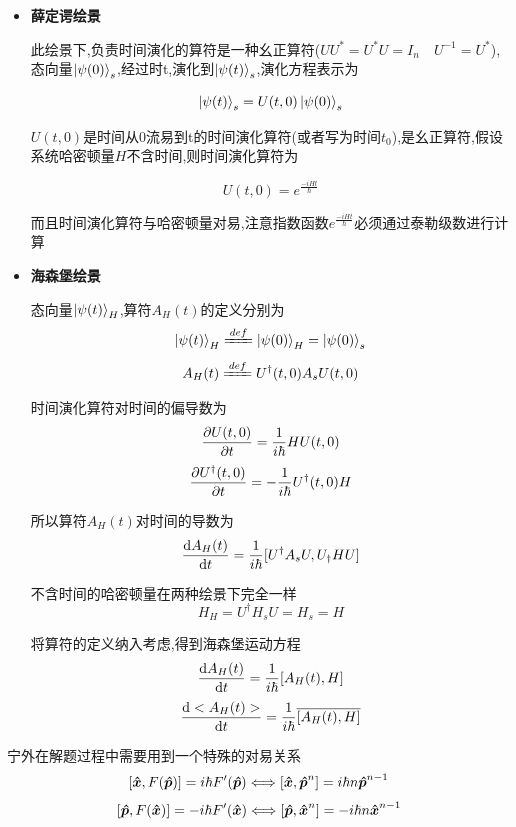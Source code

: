             \begin{formal}

                \begin{itemize}
                    \item 
                    \textbf{薛定谔绘景} 

                    此绘景下,负责时间演化的算符是一种幺正算符($ UU^{*} = U^{*}U = I_{n} \quad U^{-1} = U^{*} $),态向量$\ket{\psi(0)}_{s}$,经过时t,演化到$\ket{\psi(t)}_{s}$,演化方程表示为
    
                    $$ \ket{\psi(t)}_{s} = U(t,0) \ket{\psi(0)}_{s} $$
    
                    $U(t,0)$是时间从0流易到t的时间演化算符(或者写为时间$t_{0}$),是幺正算符,假设系统哈密顿量$H$不含时间,则时间演化算符为
    
                    $$ U(t,0) = e^{\frac{-iHt}{\hbar}} $$
    
                    而且时间演化算符与哈密顿量对易,注意指数函数$e^{\frac{-iHt}{\hbar}}$必须通过泰勒级数进行计算

                    \item   
                    \textbf{海森堡绘景} 

                    态向量$\ket{\psi(t)}_{H}$,算符$A_{H}(t)$的定义分别为
                    $$ \ket{\psi(t)}_{H} \xlongequal{def} \ket{\psi(0)}_{H} = \ket{\psi(0)}_{s}$$
                    $$ A_{H}(t) \xlongequal{def} U^{\dagger}(t,0)A_{s}U(t,0) $$

                    时间演化算符对时间的偏导数为
                    $$ \pdv{U(t,0)}{t} = \frac{1}{i\hbar} H U(t,0) $$
                    $$ \pdv{U^{\dagger}(t,0)}{t} = - \frac{1}{i\hbar} U^{\dagger}(t,0) H$$

                    所以算符$A_{H}(t)$对时间的导数为
                    $$ \dv{A_{H}(t)}{t} = \frac{1}{i \hbar} [U^{\dagger} A_{s} U,U_{\dagger} H U]$$

                    不含时间的哈密顿量在两种绘景下完全一样
                    $$ H_{H} = U^{\dagger} H_{s} U = H_{s} =H $$

                    将算符的定义纳入考虑,得到海森堡运动方程
                    $$ \dv{A_{H}(t)}{t} = \frac{1}{i\hbar} [A_{H}(t),H] $$
                    $$ \dv{<A_{H}(t)>}{t} = \frac{1}{i\hbar} \overline{[A_{H}(t),H]} $$
                \end{itemize}

                宁外在解题过程中需要用到一个特殊的对易关系
                $$ [\vu*{x} , F(\vu*{p})] = i\hbar F'(\vu*{p}) \Longleftrightarrow [\vu*{x} , \vu*{p}^{n}] = i\hbar n \vu*{p}^{n-1} $$
                $$ [\vu*{p} , F(\vu*{x})] = -i\hbar F'(\vu*{x}) \Longleftrightarrow [\vu*{p} , \vu*{x}^{n}] = -i\hbar n \vu*{x}^{n-1} $$
                


                
            \end{formal}
            

